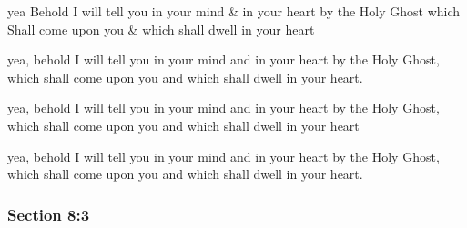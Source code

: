 		\begin{framed}
		\scriptsize
			\begin{compactdesc}
				\item[JSP] yea Behold I will tell you in your mind \& in your heart by the Holy Ghost which Shall come upon you \& which shall dwell in your heart
				\item[BC] yea, behold I will tell you in your mind and in your heart by the Holy Ghost, which shall come upon you and which shall dwell in your heart.
				\item[DC 1835] yea, behold I will tell you in your mind and in your heart by the Holy Ghost, which shall come upon you and which shall dwell in your heart
				\item[DC 1844] yea, behold I will tell you in your mind and in your heart by the Holy Ghost, which shall come upon you and which shall dwell in your heart.
			\end{compactdesc}
		\end{framed}

	\subsubsection{Section 8:3} %
		\label{DC8-3}

